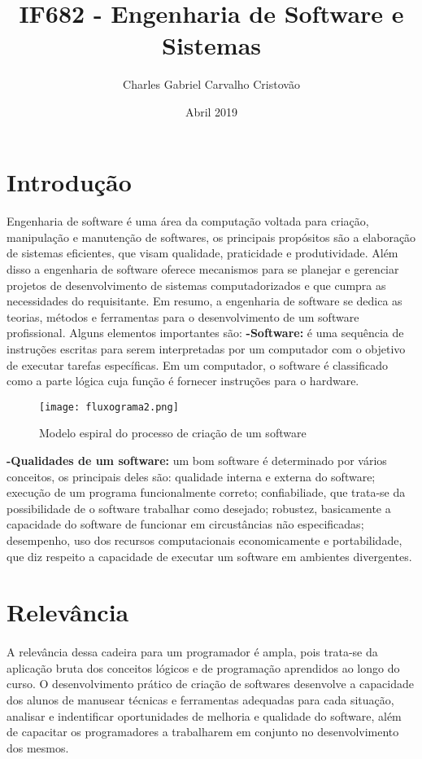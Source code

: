 \documentclass[10pt]{article}
\title{IF682 - Engenharia de Software e Sistemas}
\author{Charles Gabriel Carvalho Cristovão}
\date{Abril 2019}
\begin{document}
\maketitle

\section{Introdução}
\paragraph{}Engenharia de software é uma área da computação voltada para criação, manipulação e manutenção de softwares, os principais propósitos são a elaboração de sistemas eficientes, que visam qualidade, praticidade e produtividade. Além disso a engenharia de software oferece mecanismos para se planejar e gerenciar projetos de desenvolvimento de sistemas computadorizados e que cumpra as necessidades do requisitante. Em resumo, a engenharia de software se dedica as teorias, métodos e ferramentas para o desenvolvimento de um software profissional.\cite{pagina} Alguns elementos importantes são:\newline
\textbf{-Software:} é uma sequência de instruções escritas para serem interpretadas por um computador com o objetivo de executar tarefas específicas. Em um computador, o software é classificado como a parte lógica cuja função é fornecer instruções para o hardware.\citep{slide4}

\begin{figure}[ht]
    \centering
    \texttt{[image: fluxograma2.png]}
    \caption{Modelo espiral do processo de criação de um software}\citep{slide2}
    \label{fig:fluxograma2}
\end{figure}
\newpage
\textbf{-Qualidades de um software:} um bom software é determinado por vários conceitos, os principais deles são: qualidade interna e externa do software; execução de um programa funcionalmente correto; confiabiliade, que trata-se da possibilidade de o software trabalhar como desejado; robustez, basicamente a capacidade do software de funcionar em circustâncias não especificadas; desempenho, uso dos recursos computacionais economicamente e portabilidade, que diz respeito a capacidade de executar um software em ambientes divergentes.\citep{slide3}
\section{Relevância}
\paragraph{}A relevância dessa cadeira para um programador é ampla, pois trata-se da aplicação bruta dos conceitos lógicos e de programação aprendidos ao longo do curso. O desenvolvimento prático de criação de softwares desenvolve a capacidade dos alunos de manusear técnicas e ferramentas adequadas para cada situação, analisar e indentificar oportunidades de melhoria e qualidade do software, além de capacitar os programadores a trabalharem em conjunto no desenvolvimento dos mesmos.
\end{document}
